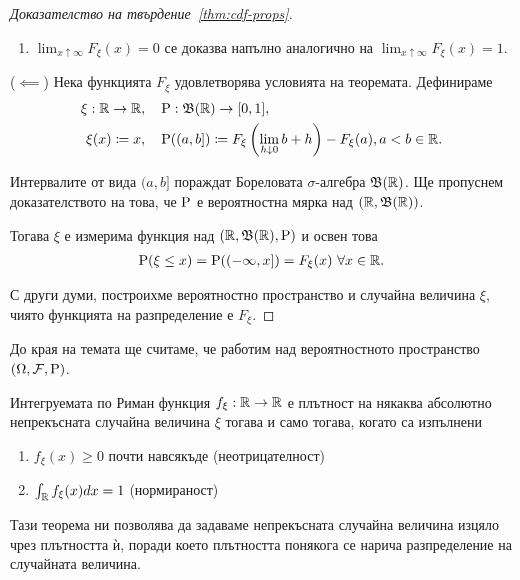 \documentclass[numbers=endperiod, bibliography=totocnumbered]{scrartcl}
\begin{document}
\begin{proof}[Доказателство на твърдение~\ref{thm:cdf-props}]
\begin{enumerate}
    \item \( \lim_{x \uparrow \infty} F_\xi(x) = 0 \) се доказва напълно аналогично на \( \lim_{x \uparrow \infty} F_\xi(x) = 1 \).
  \end{enumerate}

  (\( \impliedby \)) Нека функцията \( F_\xi \) удовлетворява условията на теоремата. Дефинираме
  \begin{align*}
    \xi: \mathbb{R} \to \mathbb{R},     &&& \operatorname{P}: \mathfrak{B}(\mathbb{R}) \to [0, 1], \\
    \xi(x) \coloneqq x, &&& \operatorname{P}((a, b]) \coloneqq F_\xi \left(\lim_{h \downarrow 0} b + h \right) - F_\xi(a), a < b \in \mathbb{R}.
  \end{align*}

  Интервалите от вида \( (a, b] \) пораждат Бореловата \( \sigma \)-алгебра \( \mathfrak{B}(\mathbb{R}) \). Ще пропуснем доказателството на това, че \( \operatorname{P} \) е вероятностна мярка над \( (\mathbb{R}, \mathfrak{B}(\mathbb{R})) \).

  Тогава \( \xi \) е измерима функция над \( (\mathbb{R}, \mathfrak{B}(\mathbb{R}), \operatorname{P}) \) и освен това
  \begin{align*}
    \operatorname{P}(\xi \leq x)
    =
    \operatorname{P}((-\infty, x])
    =
    F_\xi(x)~\forall x \in \mathbb{R}.
  \end{align*}

  С други думи, построихме вероятностно пространство и случайна величина \( \xi \), чиято функцията на разпределение е \( F_\xi \).
\end{proof}

До края на темата ще считаме, че работим над вероятностното пространство \( (\Omega, \mathcal{F}, \operatorname{P}) \).

\begin{theorem}\label{thm:density-props}
  Интегруемата по Риман функция \( f_\xi: \mathbb{R} \to \mathbb{R} \) е плътност на някаква абсолютно непрекъсната случайна величина \( \xi \) тогава и само тогава, когато са изпълнени
  \begin{enumerate}
    \item \( f_\xi(x) \geq 0 \) почти навсякъде (неотрицателност)
    \item \( \int_{\mathbb{R}} f_\xi(x) dx = 1 \) (нормираност)
  \end{enumerate}
\end{theorem}

Тази теорема ни позволява да задаваме непрекъсната случайна величина изцяло чрез плътността ѝ, поради което плътността понякога се нарича разпределение на случайната величина.
\end{document}
